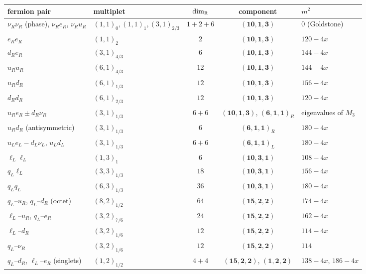 \begin{table}[t]
\centering
\footnotesize
\setlength{\tabcolsep}{4pt}
\begin{tabular}{@{}llccl@{}}
\toprule
fermion pair & multiplet & $\dim_{\mathbb{R}}$ & component & $m^2$\\
\midrule
$\nu_R\nu_R$ (phase), $\nu_Re_R$, $\nu_Ru_R$ & $(1,1)_0,(1,1)_1,(3,1)_{2/3}$ & $1+2+6$ & $(\mathbf{10},\mathbf1,\mathbf3)$ & $0$ (Goldstone)\\
$e_Re_R$ & $(1,1)_2$ & $2$ & $(\mathbf{10},\mathbf1,\mathbf3)$ & $120-4x$\\
$d_Re_R$ & $(3,1)_{4/3}$ & $6$ & $(\mathbf{10},\mathbf1,\mathbf3)$ & $144-4x$\\
$u_Ru_R$ & $(6,1)_{4/3}$ & $12$ & $(\mathbf{10},\mathbf1,\mathbf3)$ & $144-4x$\\
$u_Rd_R$ & $(6,1)_{1/3}$ & $12$ & $(\mathbf{10},\mathbf1,\mathbf3)$ & $156-4x$\\
$d_Rd_R$ & $(6,1)_{2/3}$ & $12$ & $(\mathbf{10},\mathbf1,\mathbf3)$ & $120-4x$\\
$u_Re_R\pm d_R\nu_R$ & $(3,1)_{1/3}$ & $6+6$ & $(\mathbf{10},\mathbf1,\mathbf3)$, $(\mathbf6,\mathbf1,\mathbf1)_R$ & eigenvalues of $M_3$\\
$u_Rd_R$ (antisymmetric) & $(3,1)_{1/3}$ & $6$ & $(\mathbf6,\mathbf1,\mathbf1)_R$ & $180-4x$\\
$u_Le_L-d_L\nu_L$, $u_Ld_L$ & $(3,1)_{1/3}$ & $6+6$ & $(\mathbf6,\mathbf1,\mathbf1)_L$ & $180-4x$\\
$\ell_L\ell_L$ & $(1,3)_1$ & $6$ & $(\mathbf{10},\mathbf3,\mathbf1)$ & $108-4x$\\
$q_L\ell_L$ & $(3,3)_{1/3}$ & $18$ & $(\mathbf{10},\mathbf3,\mathbf1)$ & $156-4x$\\
$q_Lq_L$ & $(6,3)_{1/3}$ & $36$ & $(\mathbf{10},\mathbf3,\mathbf1)$ & $180-4x$\\
$q_L$--$u_R$, $q_L$--$d_R$ (octet) & $(8,2)_{1/2}$ & $64$ & $(\mathbf{15},\mathbf2,\mathbf2)$ & $174-4x$\\
$\ell_L$--$u_R$, $q_L$--$e_R$ & $(3,2)_{7/6}$ & $24$ & $(\mathbf{15},\mathbf2,\mathbf2)$ & $162-4x$\\
$\ell_L$--$d_R$ & $(3,2)_{1/6}$ & $12$ & $(\mathbf{15},\mathbf2,\mathbf2)$ & $114-4x$\\
$q_L$--$\nu_R$ & $(3,2)_{1/6}$ & $12$ & $(\mathbf{15},\mathbf2,\mathbf2)$ & $114$\\
$q_L$--$d_R$, $\ell_L$--$e_R$ (singlets) & $(1,2)_{1/2}$ & $4+4$ & $(\mathbf{15},\mathbf2,\mathbf2)$, $(\mathbf1,\mathbf2,\mathbf2)$ & $138-4x$, $186-4x$\\

\end{tabular}
\end{table}
